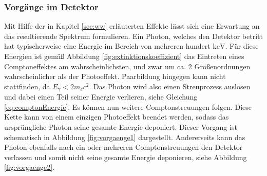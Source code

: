 \subsubsection{Vorgänge im Detektor}
\label{sec:vorgaenge}
Mit Hilfe der in Kapitel \ref{sec:ww} erläuterten Effekte lässt sich eine Erwartung an das resultierende Spektrum formulieren. Ein Photon, welches den Detektor betritt hat typischerweise eine Energie im Bereich von mehreren hundert $\si{\kilo\electronvolt}$. Für diese Energien ist gemäß Abbildung \ref{fig:extinktionskoeffizient} das Eintreten eines Comptoneffektes am wahrscheinlichsten, und zwar um ca. 2 Größenordnungen wahrscheinlicher als der Photoeffekt. Paarbildung hingegen kann nicht stattfinden, da $E_\gamma < 2m_e c^2$. Das Photon wird also einen Streuprozess auslösen und dabei einen Teil seiner Energie verlieren, siehe Gleichung \eqref{eq:comptonEnergie}. Es können nun weitere Comptonstreuungen folgen. Diese Kette kann von einem einzigen Photoeffekt beendet werden, sodass das ursprüngliche Photon seine gesamte Energie deponiert. Dieser Vorgang ist schematisch in Abbildung \ref{fig:vorgaenge1} dargestellt. Andererseits kann das Photon ebenfalls nach ein oder mehreren Comptonstreuungen den Detektor verlassen und somit nicht seine gesamte Energie deponieren, siehe Abbildung \ref{fig:vorgaenge2}. \\
